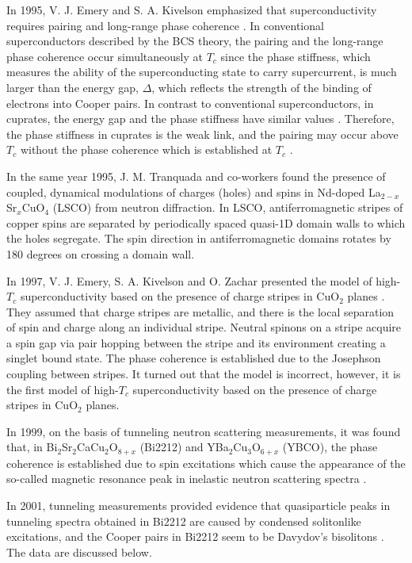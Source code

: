 In 1995, V. J. Emery and S. A. Kivelson emphasized that superconductivity 
requires pairing and long-range phase coherence \cite{Emery}. In 
conventional superconductors described by the BCS theory, the pairing and 
the long-range phase coherence occur simultaneously at $T_{c}$ since the 
phase stiffness, which measures the ability of the superconducting state to 
carry supercurrent, is much larger than the energy gap, $\Delta$, which 
reflects the strength of the binding of electrons into Cooper pairs. In 
contrast to conventional superconductors, in cuprates, the energy gap and 
the phase stiffness have similar values \cite{Emery}. Therefore, the phase 
stiffness in cuprates is the weak link, and the pairing may occur above 
$T_{c}$ without the phase coherence which is established at $T_{c}$ 
\cite{Emery}.

In the same year 1995, J. M. Tranquada and co-workers \cite{Tranquada} 
found the presence of coupled, dynamical modulations of charges (holes) 
and spins in Nd-doped La$_{2-x}$Sr$_{x}$CuO$_{4}$ (LSCO) from neutron 
diffraction. In LSCO, antiferromagnetic stripes of copper spins are 
separated by 
periodically spaced quasi-1D domain walls to which the holes segregate. 
The spin direction in antiferromagnetic domains rotates by 180 degrees 
on crossing a domain wall. 

In 1997, V. J. Emery, S. A. Kivelson and O. Zachar presented the model 
of high-$T_{c}$ superconductivity based on the presence of charge stripes 
in CuO$_{2}$ planes \cite{Emery2}. They assumed that charge stripes are 
metallic, and there is the local separation of spin and charge along an 
individual stripe. Neutral spinons on a stripe acquire a spin gap via pair 
hopping between the stripe and its environment creating a singlet bound 
state. The phase coherence is established due to the Josephson coupling 
between stripes. It turned out that the model is incorrect, 
however, it is the first model of high-$T_{c}$ superconductivity based on 
the presence of charge stripes in CuO$_{2}$ planes. 

In 1999, on the basis of tunneling neutron scattering measurements, it 
was found that, in Bi$_{2}$Sr$_{2}$CaCu$_{2}$O$_{8+x}$ (Bi2212) and 
YBa$_{2}$Cu$_{3}$O$_{6+x}$ (YBCO), the phase coherence is established 
due to spin excitations \cite{AMour1,AMour9} which cause the appearance 
of the so-called magnetic resonance peak in inelastic neutron scattering 
spectra \cite{Mignod}.

In 2001, tunneling measurements provided evidence that 
quasiparticle peaks in tunneling spectra obtained in Bi2212 are caused 
by condensed solitonlike excitations, and the Cooper pairs in Bi2212 
seem to be Davydov's bisolitons \cite{AMour2,AMour3}. 
The data are discussed below.

